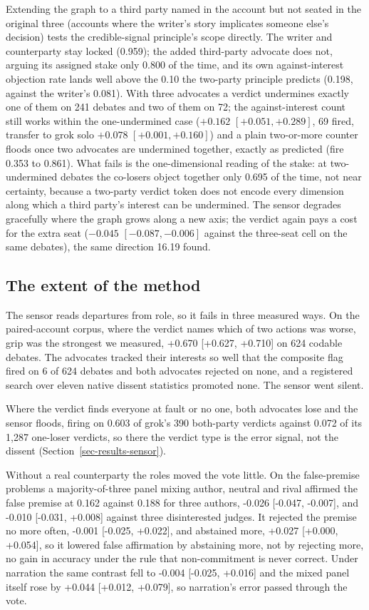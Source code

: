 Extending the graph to a third party named in the account but not seated
in the original three (accounts where the writer's story implicates
someone else's decision) tests the credible-signal principle's scope
directly. The writer and counterparty stay locked (0.959); the added
third-party advocate does not, arguing its assigned stake only 0.800 of
the time, and its own against-interest objection rate lands well above
the 0.10 the two-party principle predicts (0.198, against the writer's
0.081). With three advocates a verdict undermines exactly one of them on
241 debates and two of them on 72; the against-interest count still works
within the one-undermined case ($+0.162$ $[+0.051, +0.289]$, 69 fired,
transfer to grok solo $+0.078$ $[+0.001, +0.160]$) and a plain two-or-more
counter floods once two advocates are undermined together, exactly as
predicted (fire 0.353 to 0.861).
What fails is the one-dimensional reading of the stake: at two-undermined
debates the co-losers object together only 0.695 of the time, not near
certainty, because a two-party verdict token does not encode every
dimension along which a third party's interest can be undermined. The
sensor degrades gracefully where the graph grows along a new axis; the
verdict again pays a cost for the extra seat ($-0.045$ $[-0.087, -0.006]$
against the three-seat cell on the same debates), the same direction 16.19
found.

\subsection{The extent of the method}
\label{sec-results-extent}

The sensor reads departures from role, so it fails in three measured ways. On
the paired-account corpus, where the verdict names which of two actions was
worse, grip was the strongest we measured, +0.670 [+0.627, +0.710] on
624 codable debates.
The advocates tracked their interests so well that the composite flag fired
on 6 of 624 debates and both advocates rejected on none,
and a registered search over eleven native dissent statistics promoted
none.
The sensor went silent.

Where the verdict finds everyone at fault or no one, both advocates lose and
the sensor floods, firing on 0.603 of grok's 390 both-party verdicts
against 0.072 of its 1,287 one-loser verdicts, so there the verdict type
is the error signal, not the dissent (Section~\ref{sec-results-sensor}).

Without a real counterparty the roles moved the vote little. On the
false-premise problems a majority-of-three panel mixing author, neutral and
rival affirmed the false premise at 0.162 against 0.188 for three
authors, -0.026 [-0.047, -0.007], and -0.010 [-0.031, +0.008] against
three disinterested judges.
It rejected the premise no more often, -0.001 [-0.025, +0.022], and
abstained more, +0.027 [+0.000, +0.054], so it lowered false affirmation
by abstaining more, not by rejecting more, no gain in accuracy under the
rule that non-commitment is never correct.
Under narration the same contrast fell to -0.004 [-0.025, +0.016] and the
mixed panel itself rose by +0.044 [+0.012, +0.079], so narration's error
passed through the vote.

